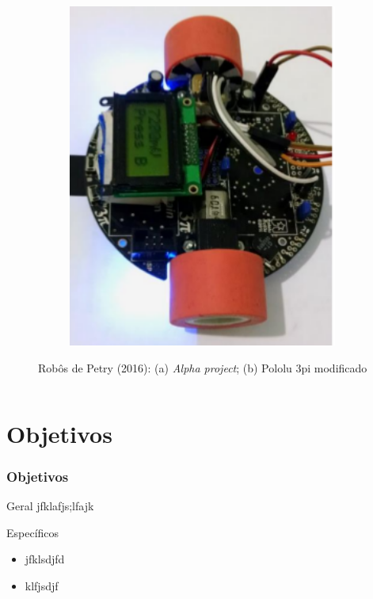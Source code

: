 \begin{frame}
\begin{columns}
\begin{figure}[h]
\begin{subfigure}[b]{0.3\textwidth}
         \includegraphics[width=1\textwidth,height=0.4\textheight]{Figuras/polulumod.png}
         \caption{\centering \label{fig:pololumarcio}}
     \end{subfigure}
	\caption{Robôs de Petry (2016): (a) \textit{Alpha project}; (b) Pololu 3pi modificado}
 \end{figure}
	
\end{columns}
\end{frame}


\section{Objetivos}

\begin{frame}
\frametitle{Objetivos}
\begin{block}{Geral}
	 jfklafjs;lfajk
\end{block}

\begin{block}{Específicos}
	\begin{itemize}
	\item jfklsdjfd
	\item klfjsdjf
	\end{itemize}
\end{block}

\end{frame}

